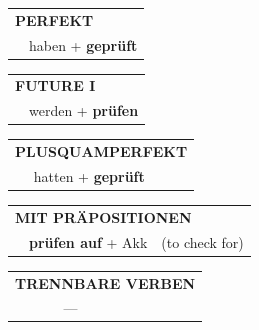 \documentclass[10pt,a4paper]{revtex4-2}
\begin{document}
\begin{verbbox}
\vspace{10pt}

\begin{tabular}{rl}
\multicolumn{2}{l}{\textbf{PERFEKT}}\\
& haben + \textbf{geprüft}\\
\end{tabular}
\hfill
\begin{tabular}{rl}
\multicolumn{2}{l}{\textbf{FUTURE I}}\\
& werden + \textbf{prüfen}\\
\end{tabular}
\hfill
\begin{tabular}{rl}
\multicolumn{2}{l}{\textbf{PLUSQUAMPERFEKT}}\\
& hatten + \textbf{geprüft}\\
\end{tabular}

\vspace{10pt}

\begin{tabular}{lll}
\multicolumn{3}{l}{\textbf{MIT PRÄPOSITIONEN}}\\
& \textbf{prüfen auf} + Akk & (to check for)\\
\end{tabular}
\hfill
\begin{tabular}{lll}
\multicolumn{3}{l}{\textbf{TRENNBARE VERBEN}}\\
& ---\\
\end{tabular}
\vspace{-5pt}
\end{verbbox}
\end{document}
